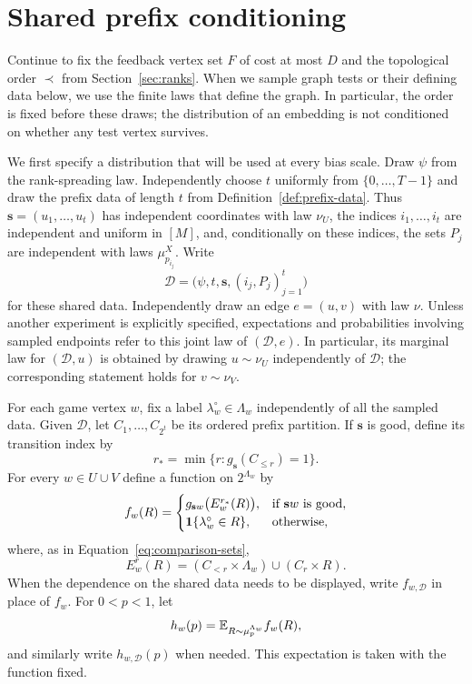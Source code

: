 \section{Shared prefix conditioning}
\label{sec:prefix}

Continue to fix the feedback vertex set $F$ of cost at most $D$ and the
topological order $\prec$ from Section~\ref{sec:ranks}.  When we sample graph
tests or their defining data below, we use the finite laws that define the
graph.  In particular, the order is fixed before these
draws; the distribution of an embedding is not conditioned on whether any
test vertex survives.

We first specify a distribution that will be used at every bias scale.
Draw $\psi$ from the rank-spreading law.  Independently choose $t$ uniformly
from $\{0,\ldots,T-1\}$ and draw the prefix data of length $t$ from
Definition~\ref{def:prefix-data}.  Thus
$\mathbf s=(u_1,\ldots,u_t)$ has independent coordinates with law $\nu_U$,
the indices $i_1,\ldots,i_t$ are independent and uniform in $[M]$, and,
conditionally on these indices, the sets $P_j$ are independent with laws
$\mu_{p_{i_j}}^X$.  Write
\begin{equation}
  \mathcal D
  =\bigl(\psi,t,\mathbf s,(i_j,P_j)_{j=1}^t\bigr)
  \label{eq:common-conditioning}
\end{equation}
for these shared data.  Independently draw an edge $e=(u,v)$ with law
$\nu$.  Unless another experiment is explicitly specified, expectations
and probabilities involving sampled endpoints refer to this joint law of
$(\mathcal D,e)$.  In particular, its marginal law for $(\mathcal D,u)$
is obtained by drawing $u\sim\nu_U$ independently of $\mathcal D$; the
corresponding statement holds for $v\sim\nu_V$.

\begin{definition}
\label{def:conditioned-functions}
For each game vertex $w$, fix a label
$\lambda_w^\circ\in\Lambda_w$ independently of all the sampled data.
Given $\mathcal D$, let $C_1,\ldots,C_{2^t}$ be its ordered prefix
partition.  If $\mathbf s$ is good, define its transition index by
\[
  r_*=\min\{r:g_{\mathbf s}(C_{\le r})=1\}.
\]
For every $w\in U\cup V$ define a function on $2^{\Lambda_w}$ by
\[
  f_w(R)=
  \begin{cases}
    g_{\mathbf s w}\bigl(E_w^{r_*}(R)\bigr),
      &\text{if $\mathbf s w$ is good},\\
    \mathbf 1\{\lambda_w^\circ\in R\},
      &\text{otherwise},
  \end{cases}
\]
where, as in Equation~\eqref{eq:comparison-sets},
\[
  E_w^r(R)
  =(C_{<r}\times\Lambda_w)\cup(C_r\times R).
\]
When the dependence on the shared data needs to be displayed, write
$f_{w,\mathcal D}$ in place of $f_w$.  For $0<p<1$, let
\[
  h_w(p)
  =\mathbb E_{R\sim\mu_p^{\Lambda_w}} f_w(R),
\]
and similarly write $h_{w,\mathcal D}(p)$ when needed.  This expectation
is taken with the function fixed.
\end{definition}

